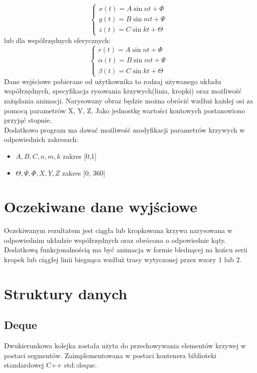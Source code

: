 \begin{equation}
	\left\{
                \begin{array}{ll}
                  x(t) = A \sin{nt + \Phi}\\
                  y(t) = B \sin{mt + \Psi}\\
                  z(t) = C \sin{kt + \Theta}
                \end{array}
              \right.
\end{equation}
lub dla współrzędnych sferycznych:
\begin{equation}
\left\{
                \begin{array}{ll}
                  r(t) = A \sin{nt + \Phi}\\
                  \alpha(t) = B \sin{mt + \Psi}\\
                  \beta(t) = C \sin{kt + \Theta}
                \end{array}
              \right.
\end{equation}
Dane wejściowe pobierane od użytkownika to rodzaj używanego układu współrzędnych, specyfikacja rysowania krzywych(linia, kropki) oraz możliwość zażądania animacji.
Narysowany obraz będzie można obrócić wzdłuż każdej osi za pomocą parametrów X, Y, Z. Jako jednostkę wartości kontowych postanowiono przyjąć stopnie.\\
Dodatkowo program ma dawać możliwość modyfikacji parametrów krzywych w odpowiednich zakresach:
\begin{itemize}
\item $A,B,C, n, m, k$ zakres [0,1]
\item $\Theta, \Psi, \Phi, X , Y, Z$ zakres [0, 360]
\end{itemize}
 
\section{Oczekiwane dane wyjściowe}
Oczekiwanym rezultatem jest ciągła lub kropkowana krzywa narysowana w odpowiednim układzie współrzędnych oraz obrócona o odpowiednie kąty.\\
Dodatkową funkcjonalnością ma być animacja w formie blednącej na końcu serii kropek lub ciągłej linii biegnąca wzdłuż trasy wytyczonej przez wzory 1 lub 2. 
\section{Struktury danych}

		\subsection{Deque}
			Dwukierunkowa kolejka została użyta do przechowywania elementów krzywej w postaci segmentów.
			Zaimplementowana w postaci kontenera biblioteki standardowej C++ std::deque.
